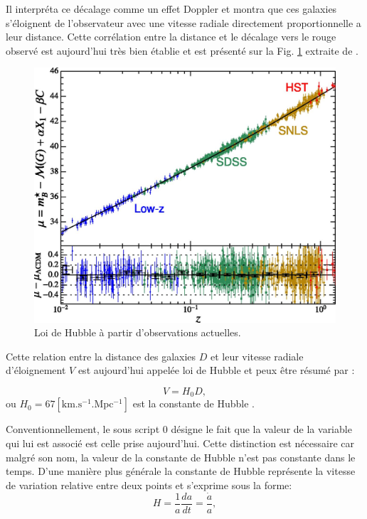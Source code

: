 Il interpréta ce décalage comme un effet Doppler et montra que ces galaxies s'éloignent de l'observateur avec une vitesse radiale directement proportionnelle a leur distance.
Cette corrélation entre la distance et le décalage vers le rouge observé est aujourd'hui très bien établie et est présenté sur la Fig. \ref{fig:hubble_law} extraite de \citep{2015PNAS..112.3173B}.

\begin{figure}[bth]
        \includegraphics[width=.9\linewidth]{img/01/hubble_law.jpg} 
        \caption{Loi de Hubble à partir d'observations actuelles. 
        }
 		\label{fig:hubble_law}
\end{figure}

Cette relation entre la distance des galaxies $D$ et leur vitesse radiale d'éloignement $V$ est aujourd'hui appelée loi de Hubble et peux être résumé par :

\begin{equation}
V = H_0 D,
\end{equation}
ou $H_0 = 67 \mathrm{ \left[ km.s^{-1}.Mpc^{-1} \right ] }$ est la constante de Hubble \citep{planck_collaboration_planck_2016}.

Conventionnellement, le sous script $0$ désigne le fait que la valeur de la variable qui lui est associé est celle prise aujourd'hui.
Cette distinction est nécessaire car malgré son nom, la valeur de la constante de Hubble n'est pas constante dans le temps.
D'une manière plus générale la constante de Hubble représente la vitesse de variation relative entre deux points et s'exprime sous la forme:
\begin{equation}
H=\frac{1}{a} \frac{da}{dt} = \frac{\dot{a}}{a},
\end{equation}

